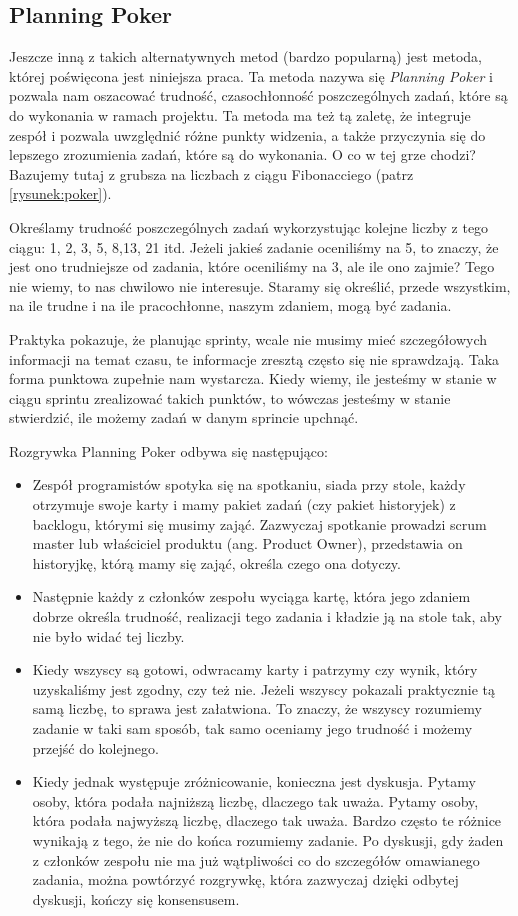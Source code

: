 \subsection{Planning Poker}

Jeszcze inną z takich alternatywnych metod (bardzo popularną) jest metoda,
której poświęcona jest niniejsza praca.
Ta metoda nazywa się \textit{Planning Poker} i pozwala nam oszacować trudność,
czasochłonność poszczególnych zadań, które są do wykonania w ramach projektu.
Ta metoda ma też tą zaletę, że integruje zespół i pozwala uwzględnić różne punkty widzenia,
a także przyczynia się do lepszego zrozumienia zadań, które są do wykonania.
O co w tej grze chodzi? Bazujemy tutaj z grubsza na liczbach z ciągu Fibonacciego (patrz \ref{rysunek:poker}).

Określamy trudność poszczególnych zadań wykorzystując kolejne liczby z tego ciągu: 1, 2, 3, 5, 8,13, 21 itd.
Jeżeli jakieś zadanie oceniliśmy na 5, to znaczy, że jest ono trudniejsze od zadania, które oceniliśmy na 3,
ale ile ono zajmie? Tego nie wiemy, to nas chwilowo nie interesuje.
Staramy się określić, przede wszystkim, na ile trudne i na ile pracochłonne, naszym zdaniem, mogą być zadania.

Praktyka pokazuje, że planując sprinty, wcale nie musimy mieć szczegółowych informacji na temat czasu,
te informacje zresztą często się nie sprawdzają.
Taka forma punktowa zupełnie nam wystarcza. Kiedy wiemy, ile jesteśmy w stanie w ciągu sprintu
zrealizować takich punktów, to wówczas jesteśmy w stanie stwierdzić, ile możemy zadań w danym sprincie upchnąć.

Rozgrywka Planning Poker odbywa się następująco:

\begin{itemize}
	\item Zespół programistów spotyka się na spotkaniu, siada przy stole,
	każdy otrzymuje swoje karty i mamy pakiet zadań (czy pakiet historyjek) z backlogu,
	którymi się musimy zająć.
	Zazwyczaj spotkanie prowadzi scrum master lub właściciel produktu (ang. Product Owner),
	przedstawia on historyjkę, którą mamy się zająć, określa czego ona dotyczy.
	\item Następnie każdy z członków zespołu wyciąga kartę, która jego zdaniem dobrze określa trudność,
	realizacji tego zadania i kładzie ją na stole tak, aby nie było widać tej liczby.
	\item Kiedy wszyscy są gotowi, odwracamy karty i patrzymy czy wynik, który uzyskaliśmy jest zgodny,
	czy też nie. Jeżeli wszyscy pokazali praktycznie tą samą liczbę, to sprawa jest załatwiona.
	To znaczy, że wszyscy rozumiemy zadanie w taki sam sposób, tak samo oceniamy jego trudność
	i możemy przejść do kolejnego.
	\item Kiedy jednak występuje zróżnicowanie, konieczna jest dyskusja.
	Pytamy osoby, która podała najniższą liczbę, dlaczego tak uważa.
	Pytamy osoby, która podała najwyższą liczbę, dlaczego tak uważa.
	Bardzo często te różnice wynikają z tego, że nie do końca rozumiemy zadanie.
	Po dyskusji, gdy żaden z członków zespołu nie ma już wątpliwości co do
	szczegółów omawianego zadania, można powtórzyć rozgrywkę, która zazwyczaj dzięki
	odbytej dyskusji, kończy się konsensusem.
\end{itemize}

